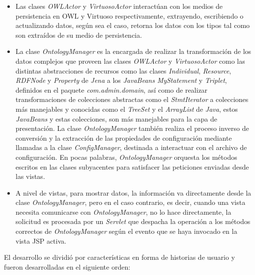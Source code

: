 \begin{itemize}
\begin{itemize}
    \item Las clases \textit{OWLActor} y \textit{VirtuosoActor} interactúan con los medios de persistencia en OWL y Virtuoso respectivamente, extrayendo, escribiendo o actualizando datos, según sea el caso, retorna los datos con los tipos tal como son extraídos de su medio de persistencia.
    \item La clase \textit{OntologyManager} es la encargada de realizar la transformación de los datos complejos que proveen las clases \textit{OWLActor} y \textit{VirtuosoActor} como las distintas abstracciones de recursos como las clases \textit{Individual}, \textit{Resource}, \textit{RDFNode} y \textit{Property} de \textit{Jena} a los \textit{JavaBeans} \textit{MyStatement} y \textit{Triplet}, definidos en el paquete \textit{com.admin.domain}, así como de realizar transformaciones de colecciones abstractas como el \textit{StmtIterator} a colecciones más manejables y conocidas como el \textit{TreeSet} y el \textit{ArrayList} de \textit{Java}, estos \textit{JavaBeans} y estas colecciones, son más manejables para la capa de presentación. La clase \textit{OntologyManager} también realiza el proceso inverso de conversión y la extracción de las propiedades de configuración mediante llamadas a la clase \textit{ConfigManager}, destinada a interactuar con el archivo de configuración. En pocas palabras, \textit{OntologyManager} orquesta los métodos escritos en las clases subyacentes para satisfacer las peticiones enviadas desde las vistas.
    \item A nivel de vistas, para mostrar datos, la información va directamente desde la clase \textit{OntologyManager}, pero en el caso contrario, es decir, cuando una vista necesita comunicarse con \textit{OntologyManager}, no lo hace directamente, la solicitud es procesada por un \textit{Servlet} que despacha la operación a los métodos correctos de \textit{OntologyManager} según el evento que se haya invocado en la vista JSP activa.

\end{itemize}

El desarrollo se dividió por características en forma de historias de usuario y fueron desarrolladas en el siguiente orden:


\end{itemize}
